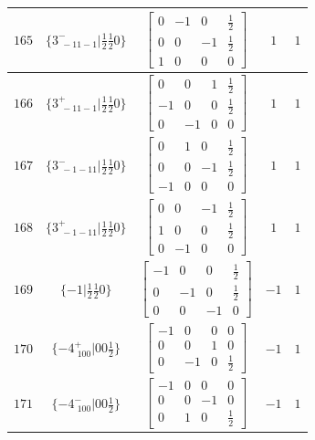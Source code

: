 \documentclass[fleqn,8pt]{jsarticle}
\begin{document}
\begin{longtable}{ccccc}
$ 165 $ & $ \{3^{-}_{\,\,-11-1}|\frac{1}{2} \frac{1}{2} 0\} $ & $ \begin{bmatrix} 0 & -1 & 0 & \frac{1}{2} \\ 0 & 0 & -1 & \frac{1}{2} \\ 1 & 0 & 0 & 0 \end{bmatrix} $ & $ 1 $ & $ 1 $ \\ \hline
$ 166 $ & $ \{3^{+}_{\,\,-11-1}|\frac{1}{2} \frac{1}{2} 0\} $ & $ \begin{bmatrix} 0 & 0 & 1 & \frac{1}{2} \\ -1 & 0 & 0 & \frac{1}{2} \\ 0 & -1 & 0 & 0 \end{bmatrix} $ & $ 1 $ & $ 1 $ \\ \hline
$ 167 $ & $ \{3^{-}_{\,\,-1-11}|\frac{1}{2} \frac{1}{2} 0\} $ & $ \begin{bmatrix} 0 & 1 & 0 & \frac{1}{2} \\ 0 & 0 & -1 & \frac{1}{2} \\ -1 & 0 & 0 & 0 \end{bmatrix} $ & $ 1 $ & $ 1 $ \\ \hline
$ 168 $ & $ \{3^{+}_{\,\,-1-11}|\frac{1}{2} \frac{1}{2} 0\} $ & $ \begin{bmatrix} 0 & 0 & -1 & \frac{1}{2} \\ 1 & 0 & 0 & \frac{1}{2} \\ 0 & -1 & 0 & 0 \end{bmatrix} $ & $ 1 $ & $ 1 $ \\ \hline
$ 169 $ & $ \{-1|\frac{1}{2} \frac{1}{2} 0\} $ & $ \begin{bmatrix} -1 & 0 & 0 & \frac{1}{2} \\ 0 & -1 & 0 & \frac{1}{2} \\ 0 & 0 & -1 & 0 \end{bmatrix} $ & $ -1 $ & $ 1 $ \\ \hline
$ 170 $ & $ \{-4^{+}_{\,\,100}|0 0 \frac{1}{2}\} $ & $ \begin{bmatrix} -1 & 0 & 0 & 0 \\ 0 & 0 & 1 & 0 \\ 0 & -1 & 0 & \frac{1}{2} \end{bmatrix} $ & $ -1 $ & $ 1 $ \\ \hline
$ 171 $ & $ \{-4^{-}_{\,\,100}|0 0 \frac{1}{2}\} $ & $ \begin{bmatrix} -1 & 0 & 0 & 0 \\ 0 & 0 & -1 & 0 \\ 0 & 1 & 0 & \frac{1}{2} \end{bmatrix} $ & $ -1 $ & $ 1 $ \\ \hline

\end{longtable}
\end{document}
